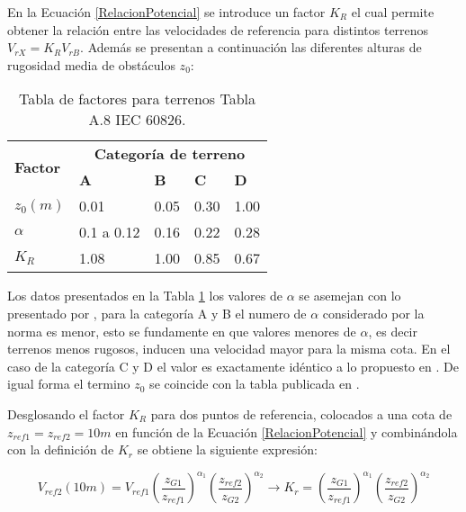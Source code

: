En la Ecuación \eqref{RelacionPotencial} se introduce un factor $K_R$ el cual permite obtener la relación entre las velocidades de referencia para distintos terrenos $V_{rX}=K_RV_{rB}$. Además se presentan a continuación las diferentes alturas de rugosidad media de obstáculos $z_0$:


\begin{table}[h] 
	\begin{footnotesize} 
		\begin{center} 
			\begin{tabular}{ |p{3cm}|p{2cm}|p{2cm}|p{2cm}|p{2cm}|} \hline
				\multirow{2}{*}{\textbf{Factor}}  & \multicolumn{4}{|c|}{ \textbf{Categoría de terreno} }  \\ 
				& \textbf{A}& \textbf{B} &\textbf{C}&\textbf{D}\\
				\hline
				$z_0(m)$   & 0.01    &0.05&  0.30 & 1.00\\ \hline
				$\alpha$& 0.1 a 0.12  & 0.16 & 0.22 &0.28\\ \hline
				$K_R$ & 1.08 &1.00 &0.85&  0.67\\ \hline
			\end{tabular}
		\end{center} 
		\caption{Tabla de factores para terrenos Tabla A.8 IEC 60826.}
		\label{Tab:laValoresTerrenos} 
	\end{footnotesize} 
\end{table}

Los datos presentados en la Tabla \ref{Tab:laValoresTerrenos} los valores de $\alpha$ se asemejan con lo presentado por \cite{Davenport1960}, para la categoría A y B el numero de $\alpha$ considerado por la norma es menor, esto se fundamente en que valores menores de $\alpha$, es decir terrenos menos rugosos, inducen una velocidad mayor para la misma cota. En el caso de la categoría C y D el valor es exactamente idéntico a lo propuesto en \citep{Davenport1960} . De igual forma el termino $z_0$ se coincide con la tabla publicada en \citep{Oke2000}.

Desglosando el factor $K_R$ para dos puntos de referencia, colocados a una cota de $z_{ref1}=z_{ref2}=10m$ en función de la Ecuación \eqref{RelacionPotencial} y combinándola con la definición de $K_r$ se obtiene la siguiente expresión: 

\begin{equation}\label{ValorKR}
	V_{ref2}(10m)=V_{ref1}\left(\frac{z_{G1}}{z_{ref1}}\right)^{\alpha_1}\left(\frac{z_{ref2}}{z_{G2}}\right)^{\alpha_2}\rightarrow K_r=\left(\frac{z_{G1}}{z_{ref1}}\right)^{\alpha_1}\left(\frac{z_{ref2}}{z_{G2}}\right)^{\alpha_2}
\end{equation}

